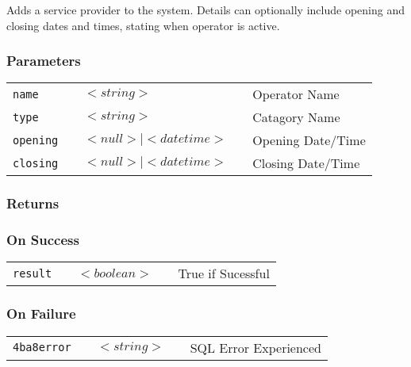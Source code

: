 Adds a service provider to the system. Details can optionally include
opening and closing dates and times, stating when operator is active.  

\subsubsection{Parameters}

\begin{tabular}{lllll}
\verb!name! & \hspace{15mm} & $<string>$ & \hspace{15mm} & Operator Name \\
\verb!type! & \hspace{15mm} & $<string>$ & \hspace{15mm} & Catagory Name \\
\verb!opening! & \hspace{15mm} & $<null> \mid <datetime>$ & \hspace{15mm} & Opening Date/Time \\
\verb!closing! & \hspace{15mm} & $<null> \mid <datetime>$ & \hspace{15mm} & Closing Date/Time \\
\end{tabular}

\subsubsection{Returns}

\subsubsection{On Success}

\begin{tabular}{lllll}
\verb!result! & \hspace{15mm} & $<boolean>$ & \hspace{15mm} & True if Sucessful \\
\end{tabular}

\subsubsection{On Failure}

\begin{tabular}{lllll}
\verb!4ba8error! & \hspace{15mm} & $<string>$ & \hspace{15mm} & SQL Error Experienced \\
\end{tabular}


